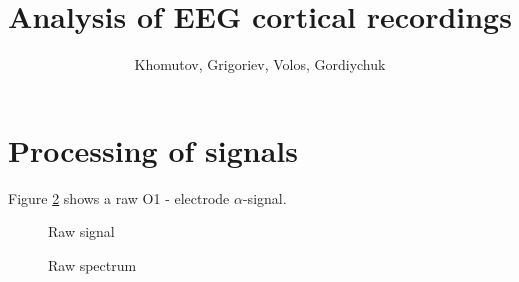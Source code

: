 \documentclass[9pt,twocolumn,twoside]{osajnl}
\title{Analysis of EEG cortical recordings}
\author{Khomutov, Grigoriev, Volos, Gordiychuk}
\begin{document}
\maketitle

\section{Processing of signals}

Figure \ref{fig:false-color} shows a raw O1 - electrode $\alpha$-signal.

\begin{figure}[htbp]
\centering
{}
\caption{Raw signal}
\label{fig:false-color}
\end{figure}

\begin{figure}[htbp]
\centering
{}
\caption{Raw spectrum}
\label{fig:false-color}
\end{figure}
\end{document}

